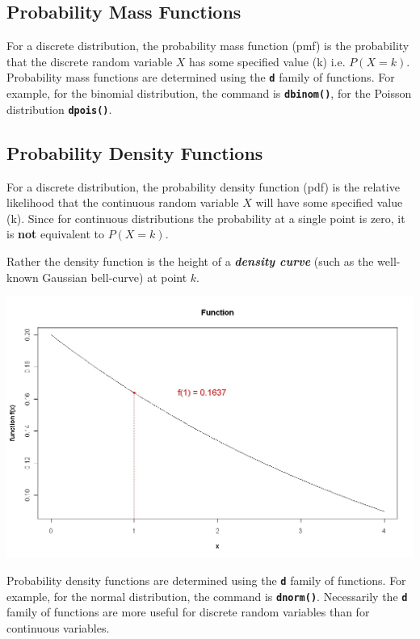 \documentclass[a4paper,12pt]{article}
\begin{document}
\subsection{Probability Mass Functions} 

For a discrete distribution, the probability mass function (pmf) is the probability that the discrete random variable $X$ has some specified value (k) i.e. $P(X = k)$. Probability mass functions are determined using the \texttt{\textbf{d}} family of functions. For example, for the binomial distribution, the command is \texttt{\textbf{dbinom()}}, for the Poisson distribution \texttt{\textbf{dpois()}}. 

\subsection{Probability Density Functions} 
For a discrete distribution, the probability density function (pdf) is the relative likelihood that the continuous random variable $X$ will have some specified value (k).
Since for continuous distributions the probability at a single point is zero, it is \textbf{not} equivalent to $P(X = k)$.

Rather the density function is the height of a \textbf{\textit{density curve}} (such as the well-known Gaussian bell-curve) at point $k$.

\begin{center}
\includegraphics[scale=0.40]{6AFunction}
\end{center}
 
 
Probability density functions are determined using the \texttt{\textbf{d}} family of functions. For example, for the normal distribution, the command is \texttt{\textbf{dnorm()}}. 
Necessarily the  \texttt{\textbf{d}} family of functions are more useful for discrete random variables than for continuous variables.
\end{document}
